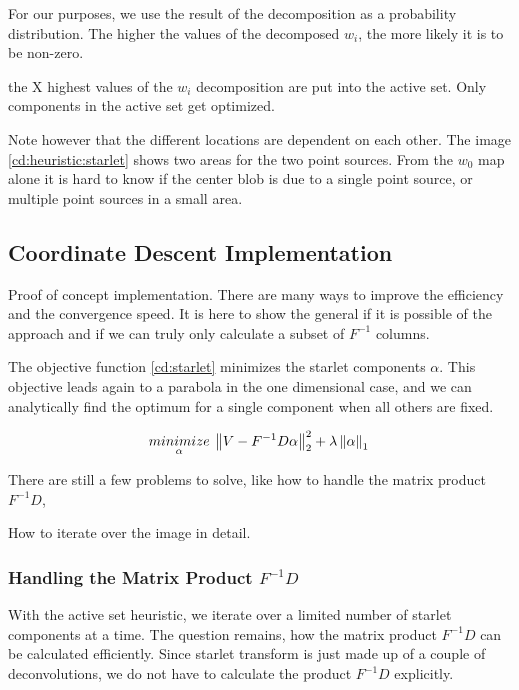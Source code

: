 For our purposes, we use the result of the decomposition as a probability distribution. The higher the values of the decomposed $w_i$, the more likely it is to be non-zero.

the X highest values of the $w_i$ decomposition are put into the active set. Only components in the active set get optimized.

Note however that the different locations are dependent on each other. The image \ref{cd:heuristic:starlet} shows two areas for the two point sources. From the $w_0$ map alone it is hard to know if the center blob is due to a single point source, or multiple point sources in a small area.


\subsection{Coordinate Descent Implementation}
Proof of concept implementation. There are many ways to improve the efficiency and the convergence speed. It is here to show  the general if it is possible of the approach and if we can truly only calculate a subset of $F^{-1}$ columns.

The objective function \eqref{cd:starlet} minimizes the starlet components $\alpha$. This objective leads again to a parabola in the one dimensional case, and we can analytically find the optimum for a single component when all others are fixed. 

\begin{equation}\label{cd:starlet}
\underset{\alpha}{minimize} \: \left \| V - F^{-1}D\alpha \right \|_2^2 + \lambda \left \| \alpha \right \|_1 \\
\end{equation}

There are still a few problems to solve, like how to handle the matrix product $F^{-1}D$, 

How to iterate over the image in detail.



\subsubsection{Handling the Matrix Product $F^{-1}D$}
With the active set heuristic, we iterate over a limited number of starlet components at a time. The question remains, how the matrix product $F^{-1}D$ can be calculated efficiently. Since starlet transform is just made up of a couple of deconvolutions, we do not have to calculate the product $F^{-1}D$ explicitly. 

